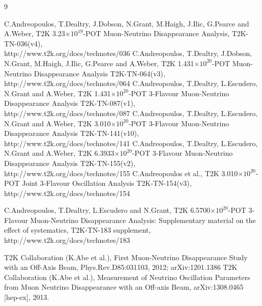 %
%

\begin{thebibliography}{9}

%
%
   C.Andreopoulos, T.Dealtry, J.Dobson, N.Grant, M.Haigh, J.Ilic, G.Pearce and A.Weber,
   T2K 3.23$\times10^{19}$-POT Muon-Neutrino Disappearance Analysis,
   T2K-TN-036(v4),\\
   http://www.t2k.org/docs/technotes/036
   C.Andreopoulos, T.Dealtry, J.Dobson, N.Grant, M.Haigh, J.Ilic, G.Pearce and A.Weber,
   T2K 1.431$\times10^{20}$-POT Muon-Neutrino Disappearance Analysis
   T2K-TN-064(v3),\\
   http://www.t2k.org/docs/technotes/064
   C.Andreopoulos, T.Dealtry, L.Escudero, N.Grant and A.Weber,
   T2K 1.431$\times10^{20}$-POT 3-Flavour Muon-Neutrino Disappearance Analysis
   T2K-TN-087(v1),\\
   http://www.t2k.org/docs/technotes/087
   C.Andreopoulos, T.Dealtry, L.Escudero, N.Grant and A.Weber,
   T2K 3.010$\times10^{20}$-POT 3-Flavour Muon-Neutrino Disappearance Analysis
   T2K-TN-141(v10),\\
   http://www.t2k.org/docs/technotes/141
   C.Andreopoulos, T.Dealtry, L.Escudero, N.Grant and A.Weber,
   T2K 6.3933$\times10^{20}$-POT 3-Flavour Muon-Neutrino Disappearance Analysis
   T2K-TN-155(v2),\\
   http://www.t2k.org/docs/technotes/155
   C.Andreopoulos et al.,
   T2K 3.010$\times10^{20}$-POT Joint 3-Flavour Oscillation Analysis
   T2K-TN-154(v3),\\
   http://www.t2k.org/docs/technotes/154

%
%
  C.Andreopoulos, T.Dealtry, L.Escudero and N.Grant,
  T2K 6.5700$\times10^{20}$-POT 3-Flavour Muon-Neutrino Disappearance Analysis:
  Supplementary material on the effect of systematics,
  T2K-TN-183 supplement,\\
  http://www.t2k.org/docs/technotes/183

%
%
   T2K Collaboration (K.Abe et al.), 
   First Muon-Neutrino Disappearance Study with an Off-Axis Beam,
   Phys.Rev.D85:031103, 2012; arXiv:1201.1386
  T2K Collaboration (K.Abe et al.),
  Measurement of Neutrino Oscillation Parameters from Muon Neutrino Disappearance with an Off-axis Beam,
  arXiv:1308.0465 [hep-ex], 2013.
  

\end{thebibliography}
